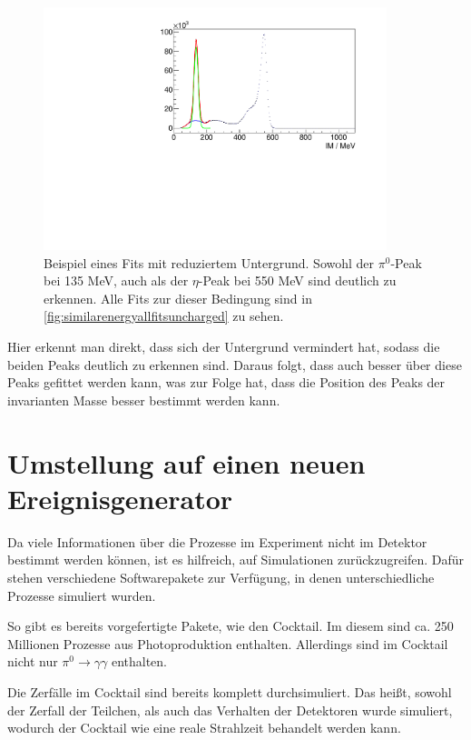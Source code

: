 \documentclass[a4paper,11pt,oneside,final,german,openbib,pdftex]{scrbook}
\begin{document}
{\begin{figure}[h!]
	\begin{center}
		\includegraphics[width=100mm]{NewCalib/Strahlzeit2014/20171904RealUnchargedFitExample}
	\end{center}
\caption[Strahlzeit: Beispiel eines Fits mit reduziertem Untergrund]{Beispiel eines Fits mit reduziertem Untergrund. Sowohl der $\pi^0$-Peak bei 135 MeV, auch als der $\eta$-Peak bei 550 MeV sind deutlich zu erkennen. Alle Fits zur dieser Bedingung sind in \ref{fig:similarenergyallfitsuncharged} zu sehen.}
\label{fig:Reduzierter-Untergrund-Fit}
\end{figure}

 Hier erkennt man direkt, dass sich der Untergrund vermindert hat, sodass die beiden Peaks deutlich zu erkennen sind. Daraus folgt, dass auch besser \"uber diese Peaks gefittet werden kann, was zur Folge hat, dass die Position des Peaks der invarianten Masse besser bestimmt werden kann.


\section{Umstellung auf einen neuen Ereignisgenerator}
\label{sec:Vorbereitung-der-Simulation}

Da viele Informationen \"uber die Prozesse im Experiment nicht im Detektor bestimmt werden k\"onnen, ist es hilfreich, auf Simulationen zur\"uckzugreifen. Daf\"ur stehen verschiedene Softwarepakete zur Verf\"ugung, in denen unterschiedliche Prozesse simuliert wurden.

So gibt es bereits vorgefertigte Pakete, wie den Cocktail.
Im diesem sind ca. 250 Millionen Prozesse aus Photoproduktion enthalten. Allerdings sind im Cocktail nicht nur $\pi^0 \rightarrow \gamma \gamma$ enthalten.

Die Zerf\"alle im Cocktail sind bereits komplett durchsimuliert. Das hei{\ss}t, sowohl der Zerfall der Teilchen, als auch das Verhalten der Detektoren wurde simuliert, wodurch der Cocktail wie eine reale Strahlzeit behandelt werden kann.

}
\end{document}
